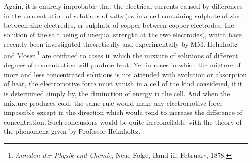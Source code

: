 \documentclass[12pt]{article}
\begin{document}
Again, it is entirely improbable that the electrical currents caused by differences in the concentration of solutions of salts (as in a cell containing sulphate of zinc between zinc electrodes, or sulphate of copper between copper electrodes, the solution of the salt being of unequal strength at the two electrodes), which have recently been investigated theoretically and experimentally by MM. Helmholtz and Moser,\footnote{\textit{Annalen der Physik und Chemie}, Neue Folge, Band iii, February, 1878.} are confined to cases in which the mixture of solutions of different degrees of concentration will produce heat. Yet in cases in which the mixture of more and less concentrated solutions is not attended with evolution or absorption of heat, the electromotive force must vanish in a cell of the kind considered, if it is determined simply by, the diminution of energy in the cell. And when the mixture produces cold, the same rule would make any electromotive force impossible except in the direction which would tend to increase the difference of concentration. Such conclusions would be quite irreconcilable with the theory of the phenomena given by Professor Helmholtz.
\end{document}
